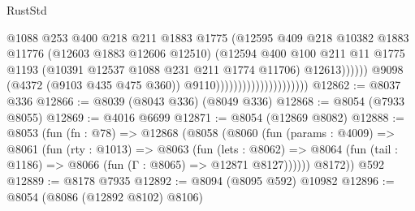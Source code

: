 \begin{lexlean}{RustStd}
\begin{coremodule}
                                                      @1088
                                                      @253
                                                      @400
                                                      @218
                                                      @211
                                                      @1883
                                                      @1775
                                                      (@12595
                                                        @409
                                                        @218
                                                        @10382
                                                        @1883
                                                        @11776
                                                        (@12603 @1883 @12606 @12510)
                                                        (@12594
                                                          @400
                                                          @100
                                                          @211
                                                          @11
                                                          @1775
                                                          @1193
                                                          (@10391
                                                            @12537
                                                            @1088
                                                            @231
                                                            @211
                                                            @1774
                                                            @11706)
                                                          @12613))))))
                                              @9098
                                              (@4372 (@9103 @435 @475 @360))
                                              @9110)))))))))))))))))))))
@12862 := @8037 @336
@12866 := @8039 (@8043 @336) (@8049 @336)
@12868 := @8054 (@7933 @8055)
@12869 := @4016 @6699
@12871 := @8054 (@12869 @8082)
@12888 := @8053
    (fun (fn : @78) =>
    @12868
      (@8058
        (@8060
          (fun (params : @4009) =>
          @8061
            (fun (rty : @1013) =>
            @8063
              (fun (lets : @8062) =>
              @8064 (fun (tail : @1186) => @8066 (fun (Γ : @8065) => @12871 @8127))))))
        @8172))
    @592
@12889 := @8178 @7935
@12892 := @8094 (@8095 @592) @10982
@12896 := @8054 (@8086 (@12892 @8102) @8106)

\end{coremodule}
\end{lexlean}
